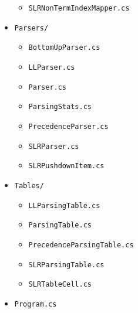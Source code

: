 \begin{itemize}
\begin{itemize}
        \item \verb|SLRNonTermIndexMapper.cs|
    \end{itemize}
    \item \verb|Parsers/|
    \begin{itemize}
        \item \verb|BottomUpParser.cs|
        \item \verb|LLParser.cs|
        \item \verb|Parser.cs|
        \item \verb|ParsingStats.cs|
        \item \verb|PrecedenceParser.cs|
        \item \verb|SLRParser.cs|
        \item \verb|SLRPushdownItem.cs|
    \end{itemize}
    \item \verb|Tables/|
    \begin{itemize}
        \item \verb|LLParsingTable.cs|
        \item \verb|ParsingTable.cs|
        \item \verb|PrecedenceParsingTable.cs|
        \item \verb|SLRParsingTable.cs|
        \item \verb|SLRTableCell.cs|
    \end{itemize}
    \item \verb|Program.cs|
\end{itemize}


